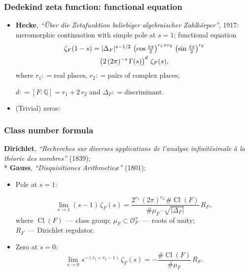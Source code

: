 \documentclass[handout]{beamer}
\newcommand{\personality}[1]{{\bf #1}}
\newcommand{\QQ}{\mathbb{Q}}
\DeclareMathOperator{\Cl}{Cl}
\renewcommand{\O}{\mathcal{O}}
\newcommand{\dfn}{\mathrel{\mathop:}=}
\begin{document}
\begin{frame}
  \frametitle{Dedekind zeta function: functional equation}

  \begin{itemize}
  \item<2-> \personality{Hecke}, \emph{``\"Uber die Zetafunktion beliebiger
      algebraischer Zahlk\"orper''}, 1917: meromorphic continuation with simple
    pole at $s=1$; functional equation
    \begin{multline*}
      $$\zeta_F (1-s) = |\Delta_F|^{s - 1/2} \, \left(\cos \frac{\pi s}{2}\right)^{r_1+r_2} \, \left(\sin \frac{\pi s}{2}\right)^{r_2} \\
      \left(2 \, (2\pi)^{-s} \, \Gamma (s)\right)^d\,\zeta_F (s),
    \end{multline*}
    where
    $r_1 \dfn \text{real places}$, $r_2 \dfn \text{pairs of complex places}$;

    $d \dfn [F : \QQ] = r_1 + 2\,r_2$ and $\Delta_F \dfn \text{discriminant}$.

  \item<4-> (Trivial) zeros:
  \end{itemize}

\end{frame}


\begin{frame}
  \frametitle{Class number formula}

  \personality{Dirichlet}, \emph{``Recherches sur diverses applications de l'analyse infinit\'esimale \`a la th\'eorie des nombres''} (1839);\\
  * \personality{Gauss}, \emph{``Disquisitiones Arithmetic\ae''} (1801):

  \begin{itemize}
  \item<2-> Pole at $s = 1$:

    $$\lim_{s\to 1} (s-1)\,\zeta_F (s) = \frac{2^{r_1}\,(2\pi)^{r_2}\,\#\Cl (F)}{\#\mu_F \cdot \sqrt{|\Delta_F|}}\,R_F,$$
    where $\Cl (F)$~--- class group; $\mu_F \subset \O^\times_F$~--- roots of unity;\\
    $R_F$~--- Dirichlet regulator.

  \item<3-> Zero at $s = 0$:
    $$\lim_{s\to 0} s^{-(r_1 + r_2 - 1)}\,\zeta_F (s) = -\frac{\#\Cl (F)}{\#\mu_F}\,R_F.$$
  \end{itemize}
\end{frame}
\end{document}
